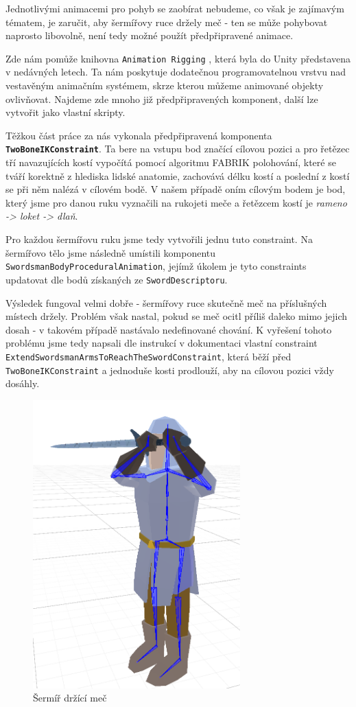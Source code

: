 Jednotlivými animacemi pro pohyb se zaobírat nebudeme, co však je zajímavým tématem, je zaručit, aby šermířovy ruce držely meč - ten se může pohybovat naprosto libovolně, není tedy možné použít předpřipravené animace. 

Zde nám pomůže knihovna \texttt{Animation Rigging} \cite{AnimationRigging}, která byla do Unity představena v nedávných letech. Ta nám poskytuje dodatečnou programovatelnou vrstvu nad vestavěným animačním systémem, skrze kterou můžeme animované objekty ovlivňovat. Najdeme zde mnoho již předpřipravených komponent, další lze vytvořit jako vlastní skripty.

Těžkou část práce za nás vykonala předpřipravená komponenta \textbf{\texttt{TwoBoneIKConstraint}}. Ta bere na vstupu bod značící cílovou pozici a pro řetězec tří navazujících kostí vypočítá pomocí algoritmu FABRIK \cite{FabrikSolverIK} polohování, které se tváří korektně z hlediska lidské anatomie, zachovává délku kostí a poslední z kostí se při něm nalézá v cílovém bodě. V našem případě oním cílovým bodem je bod, který jsme pro danou ruku vyznačili na rukojeti meče a řetězcem kostí je \textit{rameno -> loket -> dlaň}.

Pro každou šermířovu ruku jsme tedy vytvořili jednu tuto constraint. Na šermířovo tělo jsme následně umístili komponentu \texttt{SwordsmanBodyProceduralAnimation}, jejímž úkolem je tyto constraints updatovat dle bodů získaných ze \texttt{SwordDescriptoru}. 

Výsledek fungoval velmi dobře - šermířovy ruce skutečně meč na příslušných místech držely. Problém však nastal, pokud se meč ocitl příliš daleko mimo jejich dosah - v takovém případě nastávalo nedefinované chování. K vyřešení tohoto problému jsme tedy napsali dle instrukcí v dokumentaci vlastní constraint \texttt{ExtendSwordsmanArmsToReachTheSwordConstraint}, která běží před \texttt{TwoBoneIKConstraint} a jednoduše kosti prodlouží, aby na cílovou pozici vždy dosáhly.


\begin{figure}[ht]\centering
  \center
  \includegraphics[width=80mm]{../img/swordsmanProceduralAnimation.png}
  \caption{Šermíř držící meč}
  \label{obr05:swordsmanProceduralAnimation}
\end{figure} 


